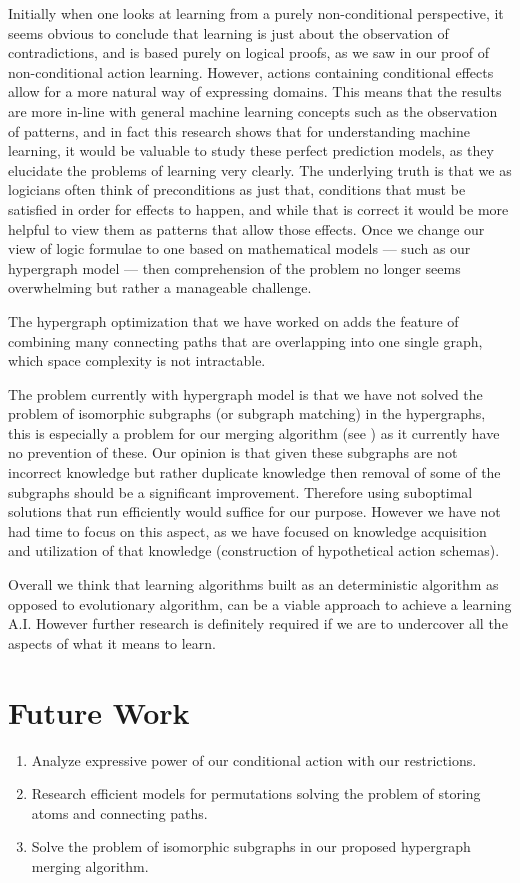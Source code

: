 \documentclass[Master.tex]{subfiles}
\begin{document}
Initially when one looks at learning from a purely non-conditional perspective, 
it seems obvious to conclude that learning is just about the observation of contradictions,
and is based purely on logical proofs, as we saw in our proof of non-conditional action learning.
However, actions containing conditional effects allow for a more natural way of expressing domains.
This means that the results are more in-line with general machine learning concepts such as the observation of patterns, 
and in fact this research shows that for understanding machine learning, it would be valuable to study these perfect prediction models, as they elucidate the problems of learning very clearly. The underlying truth is that we as logicians often think of preconditions as just that, conditions that must be satisfied in order for effects to happen, and while that is correct it would be more helpful to view them as patterns that allow those effects. Once we change our view of logic formulae to one based on mathematical models --- such as our hypergraph model ---	then comprehension of the problem no longer seems overwhelming but rather a manageable challenge. 
	
The hypergraph optimization that we have worked on adds the feature of combining many connecting paths that are overlapping into one single graph, which space complexity is not intractable.
	
	The problem currently with hypergraph model is that we have not solved the problem of isomorphic subgraphs (or subgraph matching) in the hypergraphs, 
	this is especially a problem for our merging algorithm (see ) as it currently have no prevention of these.
	Our opinion is that given these subgraphs are not incorrect knowledge but rather duplicate knowledge then removal of some of the subgraphs should be a significant improvement.
	Therefore using suboptimal solutions that run efficiently would suffice for our purpose. 
	However we have not had time to focus on this aspect, as we have focused on knowledge acquisition and utilization of that knowledge (construction of hypothetical action schemas).
	
	
	Overall we think that learning algorithms built as an deterministic algorithm as opposed to evolutionary algorithm, can be a viable approach to achieve a learning A.I. However further research is definitely required if we are to undercover all the aspects of what it means to learn.

\section{Future Work}

\begin{enumerate}
    \item Analyze expressive power of our conditional action with our restrictions.
    \item Research efficient models for permutations solving the problem of storing atoms and connecting paths.
    \item Solve the problem of isomorphic subgraphs in our proposed hypergraph merging algorithm.
\end{enumerate}
	
\end{document}
